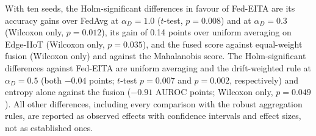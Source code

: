 \documentclass[pdflatex,sn-mathphys-num]{sn-jnl}
\begin{document}
{{With ten seeds, the Holm-significant differences in favour of Fed-EITA are its accuracy gains over FedAvg at $\alpha_D=1.0$ ($t$-test, $p=0.008$) and at $\alpha_D=0.3$ (Wilcoxon only, $p=0.012$), its gain of 0.14 points over uniform averaging on Edge-IIoT (Wilcoxon only, $p=0.035$), and the fused score against equal-weight fusion (Wilcoxon only) and against the Mahalanobis score. The Holm-significant differences against Fed-EITA are uniform averaging and the drift-weighted rule at $\alpha_D=0.5$ (both $-0.04$ points; $t$-test $p=0.007$ and $p=0.002$, respectively) and entropy alone against the fusion ($-0.91$ AUROC points; Wilcoxon only, $p=0.049$). All other differences, including every comparison with the robust aggregation rules, are reported as observed effects with confidence intervals and effect sizes, not as established ones.}
\begin{table}[!htbp]\centering
\color{black}
\caption{Per-seed values (\%) on TON-IoT underlying the paired tests.}\label{tab:perseed}
\footnotesize
\setlength{\tabcolsep}{4pt}
\end{table}
}
\end{document}
